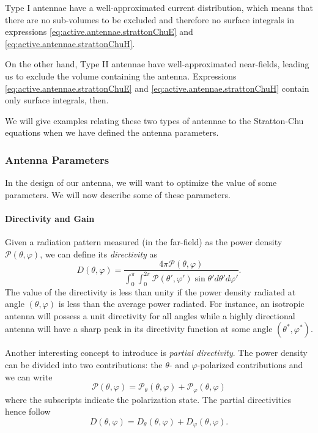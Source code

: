 Type I antennae have a well-approximated current distribution, which means that there are no
sub-volumes to be excluded and therefore no surface integrals in expressions 
\eqref{eq:active.antennae.strattonChuE} and \eqref{eq:active.antennae.strattonChuH}. 

On the other hand, Type II antennae have well-approximated near-fields, leading
us to exclude the volume containing the antenna. Expressions \eqref{eq:active.antennae.strattonChuE}
and \eqref{eq:active.antennae.strattonChuH} contain only surface integrals, then.

We will give examples relating these two types of antennae to the 
Stratton-Chu equations when we have defined the antenna parameters.

\subsubsection{Antenna Parameters}
In the design of our antenna, we will want to optimize the value
of some parameters. We will now describe some of these parameters.

\paragraph[Directivity and Gain]{Directivity and Gain \cite[\S 1.16]{ELL2003}}
Given a radiation pattern measured (in the far-field) as the power density 
$\mathcal{P}(\theta,\varphi)$, we can define its \textit{directivity}
as
  \begin{equation}
   D(\theta,\varphi) = \frac{4\pi\mathcal{P}(\theta,\varphi)}
			{\int_0^\pi\int_0^{2\pi}\mathcal{P}(\theta',\varphi')\sin\theta'd\theta'd\varphi'}.
  \end{equation}
The value of the directivity is less than unity if the power density radiated at angle $(\theta,\varphi)$
is less than the average power radiated. For instance, an isotropic antenna will possess a unit directivity
for all angles while a highly directional antenna will have a sharp peak  in its directivity function 
at some angle $(\theta^*,\varphi^*)$.

Another interesting concept to introduce is \textit{partial directivity}. 
The power density can be divided into two contributions: the $\theta$-
and $\varphi$-polarized contributions and we can write
  \begin{equation}
    \mathcal{P}(\theta,\varphi) = \mathcal{P}_\theta(\theta,\varphi)+\mathcal{P}_\varphi(\theta,\varphi)
  \end{equation}
where the subscripts indicate the polarization state. The partial 
directivities hence follow
  \begin{equation}
   D(\theta,\varphi) = D_\theta(\theta,\varphi)+D_\varphi(\theta,\varphi).
  \end{equation}

